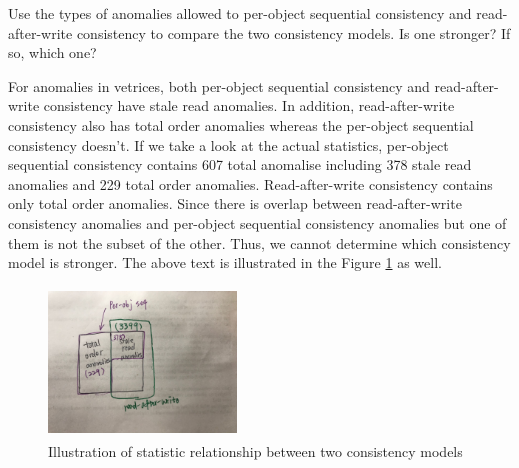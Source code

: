 \begin{QandA}
   \item Use the types of anomalies allowed to per-object sequential consistency and read-after-write consistency to compare the two consistency models. Is one stronger? If so, which one?
         \begin{answered}
		 For anomalies in vetrices, both per-object sequential consistency and read-after-write consistency have stale read anomalies.
		 In addition, read-after-write consistency also has total order anomalies whereas the per-object sequential consistency doesn't. 
		 If we take a look at the actual statistics, per-object sequential consistency contains 607 total anomalise including 378 stale read
		 anomalies and 229 total order anomalies. Read-after-write consistency contains only total order anomalies. Since there is overlap between
		 read-after-write consistency anomalies and per-object sequential consistency anomalies but one of them is not the subset of the other.
		 Thus, we cannot determine which consistency model is stronger. The above text is illustrated in the Figure \ref{0209-02} as well.
		 \begin{figure}
		 \centering
		 \includegraphics[width=5cm, height=4cm]{0209-02.jpeg} 
		 \caption{Illustration of statistic relationship between two consistency models}
		 \label{0209-02}
		 \end{figure}
         \end{answered}
         

\end{QandA}
